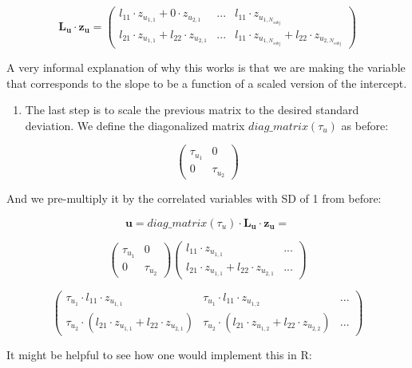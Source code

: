 \documentclass[12pt,]{krantz}
\providecommand{\tightlist}{%
  \setlength{\itemsep}{0pt}\setlength{\parskip}{0pt}}
\theoremstyle{definition}
\theoremstyle{definition}
\theoremstyle{definition}
\theoremstyle{remark}
\begin{document}
\[
  \mathbf{L_u}\cdot \mathbf{z_u}  =
  {\begin{pmatrix}
  l_{11} \cdot z_{u_{1,1}} + 0 \cdot z_{u_{2,1}} &   ... & l_{11} \cdot z_{u_{1,N_{subj}}} \\
  l_{21} \cdot z_{u_{1,1}} + l_{22} \cdot z_{u_{2,1}} & ... & l_{11} \cdot z_{u_{1,N_{subj}}} + l_{22} \cdot z_{u_{2,N_{subj}}}
  \end{pmatrix}}
  \]

A very informal explanation of why this works is that we are making the
variable that corresponds to the slope to be a function of a scaled version of
the intercept.

\begin{enumerate}
\def\labelenumi{\arabic{enumi}.}
\setcounter{enumi}{2}
\tightlist
\item
  The last step is to scale the previous matrix to the desired standard deviation. We define the diagonalized matrix \(diag\_matrix(\tau_u)\) as before:
\end{enumerate}

\[
  {\begin{pmatrix} 
  \tau_{u_1} & 0 \\ 
  0  & \tau_{u_2}
  \end{pmatrix}}
  \]

And we pre-multiply it by the correlated variables with SD of 1 from before:

\[\mathbf{u} = diag\_matrix(\tau_u) \cdot \mathbf{L_u}\cdot \mathbf{z_u} = \]

\[ 
  {\begin{pmatrix} 
  \tau_{u_1} & 0 \\ 
  0  & \tau_{u_2}
  \end{pmatrix}}
  {\begin{pmatrix}
  l_{11} \cdot z_{u_{1,1}}  & ...  \\
  l_{21} \cdot z_{u_{1,1}} + l_{22} \cdot z_{u_{2,1}} & ... 
  \end{pmatrix}}
  \]

\[ 
  {\begin{pmatrix}
  \tau_{u_1} \cdot l_{11} \cdot z_{u_{1,1}}  & \tau_{u_1} \cdot l_{11} \cdot  z_{u_{1,2}} & ...  \\
  \tau_{u_2} \cdot (l_{21} \cdot z_{u_{1,1}} + l_{22} \cdot z_{u_{2,1}}) & \tau_{u_2} \cdot (l_{21} \cdot  z_{u_{1,2}} + l_{22} \cdot z_{u_{2,2}}) & ... 
  \end{pmatrix}}
  \]

It might be helpful to see how one would implement this in R:
\end{document}
